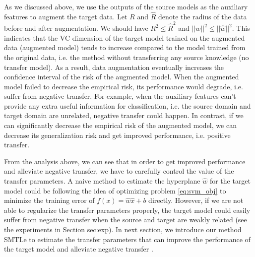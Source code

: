 As we discussed above, we use the outputs of the source models as the auxiliary features to augment the target data. Let $R$ and $\hat{R}$ denote the radius of the data before and after augmentation. We should have $R^2 \le \hat{R}^2$ and $||w||^2\le ||\hat{w}||^2$. This indicates that the VC dimension of the target model trained on the augmented data (augmented model) tends to increase compared to the model trained from the original data, i.e.  the method without transferring any source knowledge (no transfer model). As a result, data augmentation eventually increases the confidence interval of the risk of the augmented model. When the augmented model failed to decrease the empirical risk, its performance would degrade, i.e. suffer from negative transfer. For example, when the auxiliary features can't provide any extra useful information for classification, i.e. the source domain and target domain are unrelated, negative transfer could happen. In contrast, if we can significantly decrease the empirical risk of the augmented model, we can decrease its generalization risk and get improved performance, i.e. positive transfer.

From the analysis above, we can see that in order to get improved performance and alleviate negative transfer, we have to carefully control the value of the transfer parameters. A naive method to estimate the hyperplane $\hat{w}$ for the target model could be following the idea of optimizing problem \eqref{eq:svm_obj} to minimize the training error of $f(x)=\hat{w}\hat{x}+b$ directly. However, if we are not able to regularize the transfer parameters properly, the target model could easily suffer from negative transfer when the source and target are weakly related (see the experiments in Section sec:exp).
In next section, we introduce our method SMTLe to estimate the transfer parameters that can improve the performance of the target model and alleviate negative transfer .

